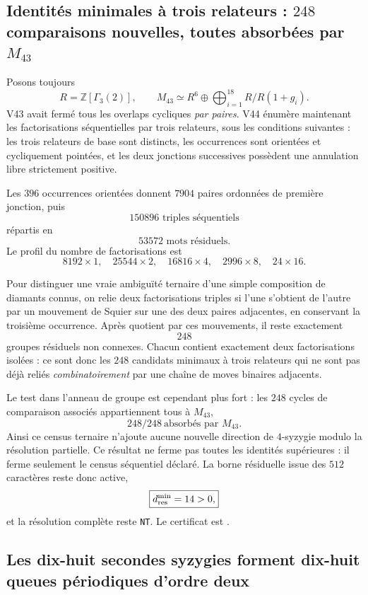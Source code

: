 \documentclass[11pt,a4paper]{article}
\newcommand{\certNT}{\texttt{NT}}
\begin{document}
\subsection{Identités minimales à trois relateurs : $248$ comparaisons nouvelles, toutes absorbées par $M_{43}$}

Posons toujours
\[
 R=\mathbb Z[\Gamma_3(2)],
 \qquad
 M_{43}\simeq R^6\oplus\bigoplus_{i=1}^{18}R/R(1+g_i).
\]
V43 avait fermé tous les overlaps cycliques \emph{par paires}. V44 énumère maintenant les factorisations séquentielles par trois relateurs, sous les conditions suivantes : les trois relateurs de base sont distincts, les occurrences sont orientées et cycliquement pointées, et les deux jonctions successives possèdent une annulation libre strictement positive.

Les $396$ occurrences orientées donnent $7904$ paires ordonnées de première jonction, puis
\[
 \boxed{150896\text{ triples séquentiels}}
\]
répartis en
\[
 \boxed{53572\text{ mots résiduels}.}
\]
Le profil du nombre de factorisations est
\[
 8192\times1,
 \quad25544\times2,
 \quad16816\times4,
 \quad2996\times8,
 \quad24\times16.
\]

Pour distinguer une vraie ambiguïté ternaire d'une simple composition de diamants connus, on relie deux factorisations triples si l'une s'obtient de l'autre par un mouvement de Squier sur une des deux paires adjacentes, en conservant la troisième occurrence. Après quotient par ces mouvements, il reste exactement
\[
 \boxed{248}
\]
groupes résiduels non connexes. Chacun contient exactement deux factorisations isolées : ce sont donc les $248$ candidats minimaux à trois relateurs qui ne sont pas déjà reliés \emph{combinatoirement} par une chaîne de moves binaires adjacents.

Le test dans l'anneau de groupe est cependant plus fort : les $248$ cycles de comparaison associés appartiennent tous à $M_{43}$,
\[
 \boxed{248/248\ \text{absorbés par }M_{43}.}
\]
Ainsi ce census ternaire n'ajoute aucune nouvelle direction de $4$-syzygie modulo la résolution partielle. Ce résultat ne ferme pas toutes les identités supérieures : il ferme seulement le census séquentiel déclaré. La borne résiduelle issue des $512$ caractères reste donc active,
\[
 \boxed{d_{\rm res}^{\min}=14>0,}
\]
et la résolution complète reste \certNT. Le certificat est .

\subsection{Les dix-huit secondes syzygies forment dix-huit queues périodiques d'ordre deux}
\end{document}

